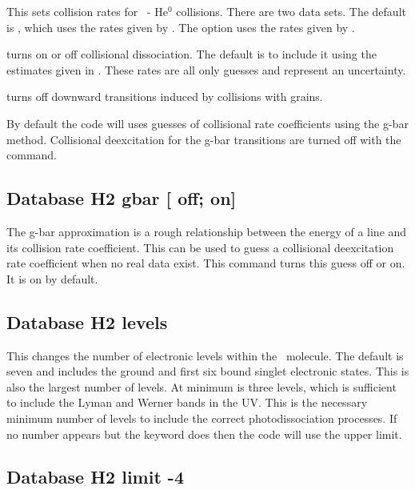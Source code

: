 
This sets collision rates for \htwo\ - He$^0$ collisions.
There are two data sets.
The default is , which uses the rates given by \citet{LeeH2He2006}.
The  option uses the rates given by \citet{LeBourlot1999}.

turns on or off collisional dissociation.
The default is to include it using the estimates given in
\citet{Shaw2005}.
These rates are all only guesses and represent an
uncertainty.

 turns off downward
transitions induced by collisions with grains.

By default the code will uses guesses of collisional rate coefficients
using the g-bar method.
Collisional deexcitation for the g-bar transitions
are turned off with the  command.

\subsection{Database H2 gbar [ off; on]}

The g-bar approximation is a rough relationship between the energy of
a line and its collision rate coefficient.  This can be used to guess a
collisional deexcitation rate coefficient when no real data exist.
This command turns this guess off or on.  It is on by default.

\subsection{Database H2 levels }

This changes the number of electronic levels within the \htwo\ molecule.
The default is seven and includes the ground and first six bound singlet
electronic states.
This is also the largest number of levels.  At minimum
is three levels, which is sufficient to include the Lyman and Werner bands
in the UV.
This is the necessary minimum number of levels to include the
correct photodissociation processes.
If no number appears but the keyword
 does then the code will use the upper limit.

\subsection{Database H2 limit -4  }

